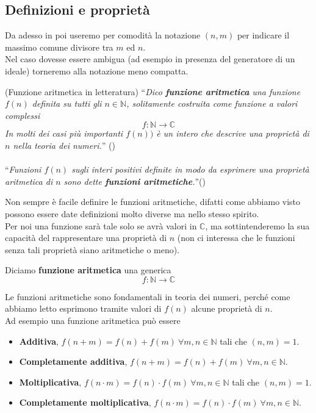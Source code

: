 \subsection{Definizioni e proprietà}
Da adesso in poi useremo per comodità la notazione $(n,m)$ per indicare il massimo comune divisore tra $m$ ed $n$.\\ Nel caso dovesse essere ambigua (ad esempio in presenza del generatore di un ideale) torneremo alla notazione meno compatta.
\begin{definizione}(Funzione aritmetica in letteratura) 
	\enquote{\textit{Dico \textbf{funzione aritmetica} una funzione $f(n)$ definita su tutti gli $n \in \mathbb{N}$, solitamente costruita come funzione a valori complessi}
	\begin{equation*}
	f:\mathbb{N}\longrightarrow\mathbb{C}
	\end{equation*}
	\textit{In molti dei casi più importanti $f(n))$ è un intero che descrive una proprietà di $n$ nella teoria dei numeri.}} (\cite[capitolo 8, pagina 143]{J12}) \\ \\
	\enquote{\textit{Funzioni $f(n)$ sugli interi positivi definite in modo da esprimere una proprietà aritmetica di $n$ sono dette \textbf{funzioni aritmetiche}.}}(\cite[capitolo 16, pagina 133; quarta edizione]{H08})%
\end{definizione}
Non sempre è facile definire le funzioni aritmetiche, difatti come abbiamo visto possono essere date definizioni molto diverse ma nello stesso spirito. \\ Per noi una funzione sarà tale solo se avrà valori in $\mathbb{C}$, ma sottintenderemo la sua capacità del rappresentare una proprietà di $n$ (non ci interessa che le funzioni senza tali proprietà siano aritmetiche o meno). 
\begin{definizione}
	Diciamo \textbf{funzione aritmetica} una generica
	\begin{equation*}
	f:\mathbb{N}\longrightarrow\mathbb{C}
	\end{equation*}
\end{definizione}
Le funzioni aritmetiche sono fondamentali in teoria dei numeri, perché come abbiamo letto esprimono tramite valori di $f(n)$ alcune proprietà di $n$. \\ Ad esempio una funzione aritmetica può essere
\begin{itemize}
	\item \textbf{Additiva}, $f(n+m)=f(n)+f(m) \ \forall m,n \in \mathbb{N}$ tali che $(n,m)=1$.
	\item \textbf{Completamente additiva}, $f(n+m)=f(n)+f(m) \ \forall m,n \in \mathbb{N}$.
	\item \textbf{Moltiplicativa}, $f(n\cdot m)=f(n)\cdot f(m) \ \forall m,n \in \mathbb{N}$ tali che $(n,m)=1$.
	\item \textbf{Completamente moltiplicativa}, $f(n\cdot m)=f(n)\cdot f(m) \ \forall m,n \in \mathbb{N}$.
\end{itemize}
